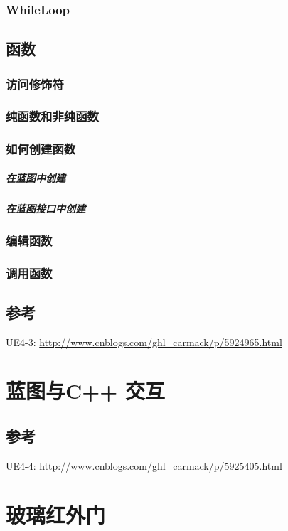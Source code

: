 \documentclass[UTF8,a4paper,12pt]{ctexbook}
\begin{document}
		\subsection{WhileLoop}
		
	\section{函数}
		\subsection{访问修饰符}
		
		\subsection{纯函数和非纯函数}
		
		\subsection{如何创建函数}
			\paragraph{在蓝图中创建}
			
			\paragraph{在蓝图接口中创建}
		
		\subsection{编辑函数}
		
		\subsection{调用函数}
	
	\section{参考}
		UE4-3: \url{http://www.cnblogs.com/ghl_carmack/p/5924965.html}


\chapter{蓝图与C++ 交互}
	

	\section{参考}
		UE4-4: \url{http://www.cnblogs.com/ghl_carmack/p/5925405.html}
		

\chapter{玻璃红外门} 


		    
\end{document}
